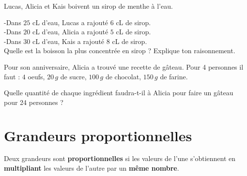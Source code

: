 \begin{pageCours} 

\begin{minipage}{0.48\linewidth}

Lucas, Alicia et Kais boivent un sirop de menthe à l'eau. 

-Dans $25$ cL d'eau, Lucas a rajouté $6$ cL de sirop.\\ 
-Dans $20$ cL d'eau, Alicia a rajouté $5$ cL de sirop.\\
-Dans $30$ cL d'eau, Kais a rajouté $8$ cL de sirop.\\
 

Quelle est la boisson la plus concentrée en sirop ? Explique ton raisonnement.

\end{minipage}\hfill
\begin{minipage}{0.48\linewidth}


Pour son anniversaire, Alicia a trouvé une recette de gâteau. Pour 4 personnes il faut : $4$ oeufs, $20\,g$ de sucre, $100\,g$ de chocolat, $150\,g$ de farine.

Quelle quantité de chaque ingrédient faudra-t-il à Alicia pour faire un gâteau pour 24 personnes ?

\end{minipage}

\section{Grandeurs proportionnelles}

\begin{Def}
Deux grandeurs sont \textbf{proportionnelles} si les valeurs de l'une s'obtiennent en \textbf{multipliant} les valeurs de l'autre par un \textbf{même nombre}.
\end{Def}



\end{pageCours}
